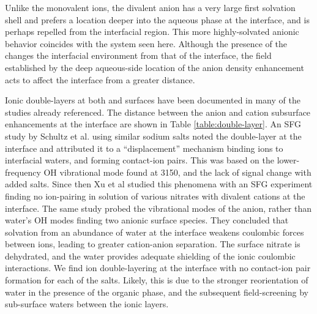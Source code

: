 Unlike the monovalent ions, the divalent \sul anion has a very large first solvation shell and prefers a location deeper into the aqueous phase at the \airwat interface,\cite{Salvador2003} and is perhaps repelled from the interfacial region.\cite{Gopalakrishnan2005} This more highly-solvated anionic behavior coincides with the \ctcwat system seen here. Although the presence of the \ctc changes the interfacial environment from that of the \airwat interface, the field established by the deep aqueous-side location of the \sul anion density enhancement acts to affect the interface from a greater distance. 

Ionic double-layers at both \airwat and \ctcwat surfaces have been documented in many of the studies already referenced. The distance between the anion and cation subsurface enhancements at the \ctcwat interface are shown in Table \ref{table:double-layer}. An SFG study by Schultz et al. using similar sodium salts noted the double-layer at the \airwat interface and attributed it to a ``displacement'' mechanism binding ions to interfacial waters, and forming contact-ion pairs. This was based on the lower-frequency OH vibrational mode found at 3150\cm, and the lack of signal change with added salts. Since then Xu et al studied this phenomena with an SFG experiment finding no ion-pairing in solution of various nitrates with divalent cations at the \airwat interface.\cite{Xu2009} The same study probed the vibrational modes of the \nit anion, rather than water's OH modes finding two anionic surface species. They concluded that solvation from an abundance of water at the interface weakens coulombic forces between ions, leading to greater cation-anion separation. The surface nitrate is dehydrated, and the water provides adequate shielding of the ionic coulombic interactions. We find ion double-layering at the \ctcwat interface with no contact-ion pair formation for each of the salts. Likely, this is due to the stronger reorientation of water in the presence of the organic phase, and the subsequent field-screening by sub-surface waters between the ionic layers.

